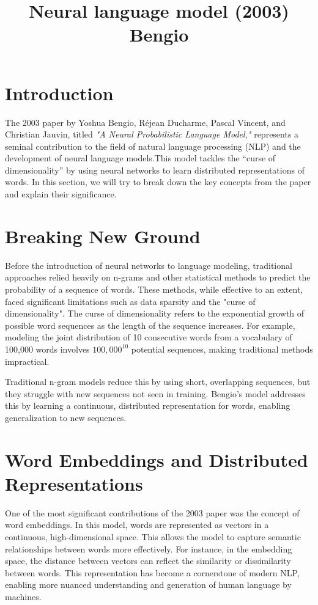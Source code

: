 \title{Neural language model (2003) Bengio}
\author{}
\date{}
\maketitle

\section*{Introduction}

The 2003 paper by Yoshua Bengio, Réjean Ducharme, Pascal Vincent, and Christian Jauvin, titled \textit{"A Neural Probabilistic Language Model,"} represents a seminal contribution to the field of natural language processing (NLP) and the development of neural language models.This model tackles the “curse of dimensionality” by using neural networks to learn distributed representations of words. In this section, we will try to break down the key concepts from the paper and explain their significance.

\section*{Breaking New Ground}

Before the introduction of neural networks to language modeling, traditional approaches relied heavily on n-grams and other statistical methods to predict the probability of a sequence of words. These methods, while effective to an extent, faced significant limitations such as data sparsity and the "curse of dimensionality". The curse of dimensionality refers to the exponential growth of possible word sequences as the length of the sequence increases. For example, modeling the joint distribution of 10 consecutive words from a vocabulary of 100,000 words involves $100,000^{10}$ potential sequences, making traditional methods impractical.

Traditional n-gram models reduce this by using short, overlapping sequences, but they struggle with new sequences not seen in training. Bengio’s model addresses this by learning a continuous, distributed representation for words, enabling generalization to new sequences.
\section*{Word Embeddings and Distributed Representations}

One of the most significant contributions of the 2003 paper was the concept of word embeddings. In this model, words are represented as vectors in a continuous, high-dimensional space. This allows the model to capture semantic relationships between words more effectively. For instance, in the embedding space, the distance between vectors can reflect the similarity or dissimilarity between words. This representation has become a cornerstone of modern NLP, enabling more nuanced understanding and generation of human language by machines.

